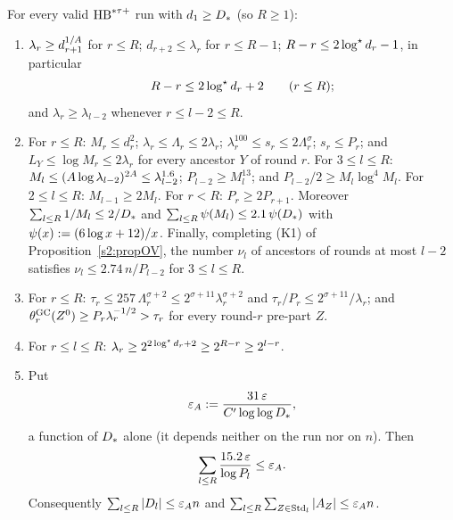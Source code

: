 \begin{lemma}\label{s2:lemTower}
For every valid $\mathrm{HB}^{*\tau{+}}$ run with $d_1\ge D_{*}$ (so $R\ge1$):
\begin{enumerate}
\item[(a)] $\lambda_r\ge d_{r+1}^{1/A}$ for $r\le R$; $d_{r+2}\le\lambda_r$
for $r\le R-1$; $R-r\le2\log^{\star} d_r-1$, in particular
\[
R-r\le2\log^{\star} d_r+2\qquad(r\le R);
\]
and $\lambda_r\ge\lambda_{l-2}$ whenever $r\le l-2\le R$.
\item[(b)] For $r\le R$: $M_r\le d_r^2$; $\lambda_r\le\Lambda_r\le2\lambda_r$;
$\lambda_r^{100}\le s_r\le2\Lambda_r^{\sigma}$; $s_r\le P_r$; and $L_Y\le\log
M_r\le2\lambda_r$ for every ancestor $Y$ of round $r$. For $3\le l\le R$:
$M_l\le(A\log\lambda_{l-2})^{2A}\le\lambda_{l-2}^{1.6}$;
$P_{l-2}\ge M_l^{13}$; and $P_{l-2}/2\ge M_l\log^4M_l$. For $2\le l\le R$:
$M_{l-1}\ge2M_l$. For $r<R$: $P_r\ge2P_{r+1}$. Moreover
$\sum_{l\le R}1/M_l\le2/D_{*}$ and $\sum_{l\le R}\psi(M_l)\le2.1\,\psi(D_{*})$
with $\psi(x)\mathrel{:=}(6\log x+12)/x$. Finally, completing (K1) of
Proposition~\ref{s2:propOV}, the number $\nu_l$ of ancestors of rounds at most
$l-2$ satisfies $\nu_l\le2.74\,n/P_{l-2}$ for $3\le l\le R$.
\item[(c)] For $r\le R$: $\tau_r\le257\,\Lambda_r^{\sigma+2}\le
2^{\sigma+11}\lambda_r^{\sigma+2}$ and $\tau_r/P_r\le2^{\sigma+11}/\lambda_r$;
and $\theta^{\mathrm{GC}}_r(Z^0)\ge P_r\lambda_r^{-1/2}>\tau_r$ for every round-$r$ pre-part
$Z$.
\item[(d)] For $r\le l\le R$: $\lambda_r\ge2^{2\log^{\star} d_r+2}\ge2^{R-r}\ge
2^{l-r}$.
\item[(e)] Put
\[
\varepsilon_{A}\mathrel{:=}\frac{31\,\varepsilon}{C'\log\log D_{*}},
\]
a function of $D_{*}$ alone (it depends neither on the run nor on $n$). Then
\[
\sum_{l\le R}\frac{15.2\,\varepsilon}{\log P_l}\le\varepsilon_{A}.
\]
Consequently $\sum_{l\le R}|D_l|\le\varepsilon_{A} n$ and $\sum_{l\le
R}\sum_{Z\in\mathrm{Std}_l}|A_Z|\le\varepsilon_{A} n$.
\end{enumerate}
\deps{\ref{s2:propDegRec}, \ref{s2:lemLacunary}, \ref{s2:defHBtp}, \ref{s1:condG1}, \ref{s1:condG2}, \ref{s2:propStructure}, \ref{s2:lemCap}, \ref{s2:propOV}, \ref{s2:defAncestors}}
\end{lemma}

